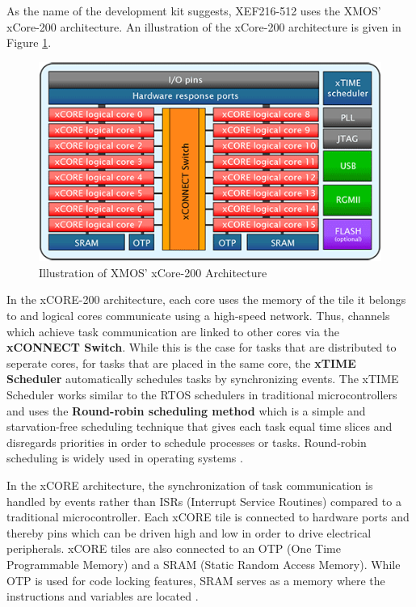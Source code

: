 As the name of the development kit suggests, XEF216-512 uses the XMOS' xCore-200 architecture. An illustration of the xCore-200 architecture is given in Figure \ref{fig:XE216Architecture}.
\begin{figure}[!ht]
	\centering
	\captionsetup{justification=centering}
	\includegraphics[scale=0.7]{content/images/XE216Architecture.png}
	\caption{Illustration of XMOS' xCore-200 Architecture \cite{xmosflyer}}
	\label{fig:XE216Architecture}
\end{figure}

In the xCORE-200 architecture, each core uses the memory of the tile it belongs to and logical cores communicate using a high-speed network. Thus, channels which achieve task communication are linked to other cores via the \textbf{xCONNECT Switch}. While this is the case for tasks that are distributed to seperate cores, for tasks that are placed in the same core, the \textbf{xTIME Scheduler} automatically schedules tasks by synchronizing events. The xTIME Scheduler works similar to the RTOS schedulers in traditional microcontrollers and uses the \textbf{Round-robin scheduling method} \cite{xmosdatasheet} \cite{roundrobin} which is a simple and starvation-free scheduling technique that gives each task equal time slices and disregards priorities in order to schedule processes or tasks. Round-robin scheduling is widely used in operating systems \cite{roundrobin}.

In the xCORE architecture, the synchronization of task communication is handled by events rather than ISRs (Interrupt Service Routines) compared to a traditional microcontroller. Each xCORE tile is connected to hardware ports and thereby pins which can be driven high and low in order to drive electrical peripherals. xCORE tiles are also connected to an OTP (One Time Programmable Memory) and a SRAM (Static Random Access Memory). While OTP is used for code locking features, SRAM serves as a memory where the instructions and variables are located \cite{xmosdatasheet}.

